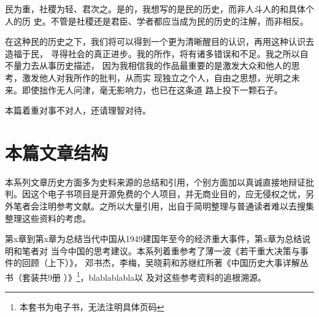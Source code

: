 民为重，社稷为轻、君次之。是的，我想写的是民的历史，而非人斗人的和具体个人的历
史。不管是社稷还是君臣、学者都应当成为民的历史的注解，而非相反。

在这种民的历史之下，我们将可以得到一个更为清晰醒目的认识，再用这种认识去造福于民，
寻得社会的真正进步。我的所作，将有诸多错误和不足。我之所以自不量力去从事历史描述，
因为我相信我的作品最重要的是激发大众和他人的思考，激发他人对我所作的批判，从而实
现独立之个人，自由之思想，光明之未来。即使拙作无人问津，毫无影响力，也已在这条道
路上投下一颗石子。

本篇着重对事不对人，还请理智对待。


\section{本篇文章结构}

本系列文章历史方面多为史料来源的总结和引用，个别方面加以真诚直接地辩证批判。因这个电子书项目是开源免费的个人项目，并无商业目的，应无侵权之忧，另外笔者会注明参考文献。之所以大量引用，出自于简明整理与普通读者难以去搜集整理这些资料的考虑。

第x章到第x章为总结当代中国从1949建国年至今的经济重大事件，第x章为总结说明和笔者对
当今中国的思考建议。本系列着重参考了薄一波《若干重大决策与事件的回顾（上下）》，
邓书杰，李梅，吴晓莉和苏继红所著《中国历史大事详解丛书（套装共9册
）》\cite{zhengshujie}\footnote{本套书为电子书，无法注明具体页码}，blablablabla以
及对这些参考资料的追根溯源。



